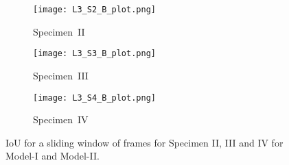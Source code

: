 \begin{sloppypar}
	\begin{figure}[!ht]
		\centering
		\begin{subfigure}[b]{0.8\textwidth}
			\centering
			\texttt{[image: L3\_S2\_B\_plot.png]}
			\caption{Specimen~II}
			\label{fig:L3_S2_B_333x333p_50kHz_5HC_IoU}
		\end{subfigure}
		\par\medskip
		\begin{subfigure}[b]{0.8\textwidth}
			\centering
			\texttt{[image: L3\_S3\_B\_plot.png]}
			\caption{Specimen~III} 
			\label{fig:L3_S3_B_333x333p_50kHz_5HC_shapes_}
		\end{subfigure}
		\par\medskip
		\begin{subfigure}[b]{0.8\textwidth}
			\centering
			\texttt{[image: L3\_S4\_B\_plot.png]}
			\caption{Specimen~IV} 
			\label{fig:L3_S4_B_333x333p_50kHz_5HC_shapes_}
		\end{subfigure}
		\caption{IoU for a sliding window of frames for Specimen II, III and IV for Model-I and Model-II.}
		\label{fig:L3_S234_B_333x333p_50kHz_5HC_IoU_centre_window}
	\end{figure} 

	

\end{sloppypar}
